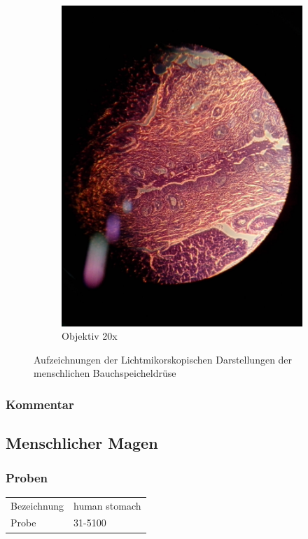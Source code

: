 \begin{figure}[h!]
\begin{subfigure}[b]{0.3\textwidth}
		\includegraphics[width=1\textwidth]{../images/04_pankreas.jpg}
		\caption{Objektiv 20x}
	\end{subfigure}
	\caption{Aufzeichnungen der Lichtmikorskopischen Darstellungen der
		menschlichen Bauchspeicheldrüse}
\end{figure}

\subsubsection{Kommentar}

\newpage
\subsection{Menschlicher Magen}

\subsubsection{Proben}
\begin{table}[h!]
	\centering
	\begin{tabular}{l l}
		Bezeichnung	& human stomach \\
		Probe 		& 31-5100
	\end{tabular}
\end{table}

